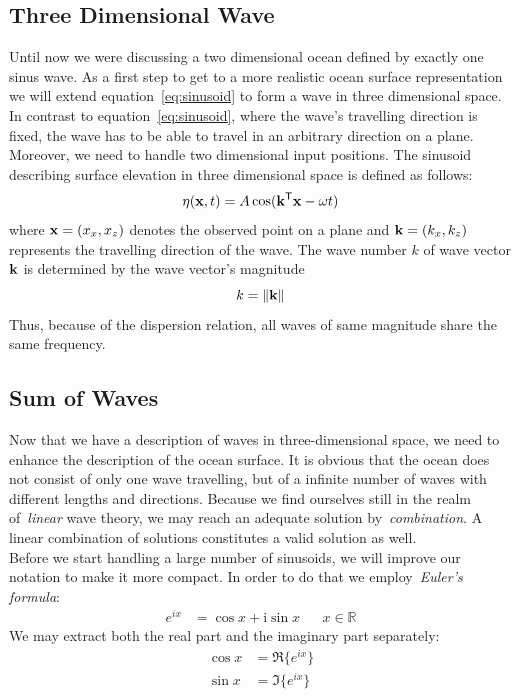 \subsection{Three Dimensional Wave}
Until now we were discussing a two dimensional ocean defined by exactly one sinus wave. As a first
step to get to a more realistic ocean surface representation we will extend equation~\ref{eq:sinusoid}
to form a wave in three dimensional space. In contrast to equation~\ref{eq:sinusoid}, where the wave's
travelling direction is fixed, the wave has to be able to travel in an arbitrary direction on a plane.
Moreover, we need to handle two dimensional input positions. The sinusoid describing surface elevation
in three dimensional space is defined as follows:
\begin{equation}
 \eta(\mathbf{x}, t) = A\cos(\mathbf{k}^{\mathsf{T}}\mathbf{x} - \omega t)
\end{equation}
where $\mathbf{x} = (x_x, x_z)$ denotes the observed point on a plane and $\mathbf{k} = (k_x, k_z)$ represents
the travelling direction of the wave. The wave number $k$ of wave vector $\mathbf{k}$ is determined by
the wave vector's magnitude
\begin{equation}
 k = \lVert\mathbf{k}\rVert
\end{equation}
Thus, because of the dispersion relation, all waves of same magnitude share the same frequency.

\subsection{Sum of Waves}
Now that we have a description of waves in three-dimensional space, we need to
enhance the description of the ocean surface. It is obvious that the ocean does
not consist of only one wave travelling, but of a infinite number of waves with
different lengths and directions. Because we find ourselves still in the realm
of~\emph{linear} wave theory, we may reach an adequate solution
by~\emph{combination}. A linear combination of solutions constitutes a valid
solution as well.\\

Before we start handling a large number of sinusoids, we will improve our
notation to make it more compact. In order to do that we employ~\emph{Euler's
formula}:
\begin{align*}
 e^{ix} &= \cos{x} + \mathrm{i}\sin{x} && x \in \mathbb{R}
\end{align*}
%
We may extract both the real part and the imaginary part separately:
\begin{align*}
 \cos{x} &= \Re\{e^{ix}\} \\
 \sin{x} &= \Im\{e^{ix}\}
\end{align*}


